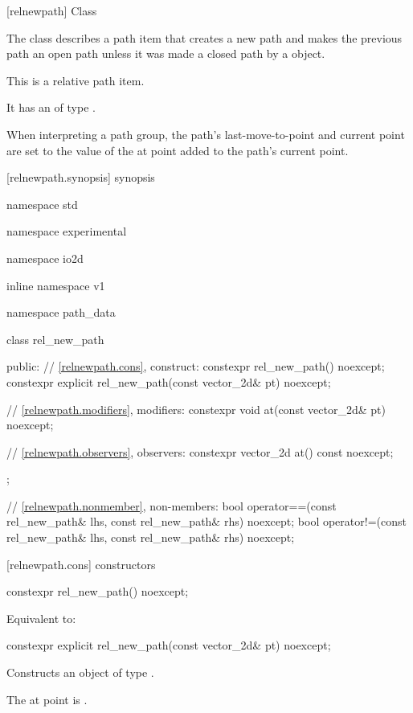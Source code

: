  [relnewpath] {Class }%

\pnum
{}%
The class  describes a path item that creates a new path and makes the previous path an open path unless it was made a closed path by a  object.

\pnum
This is a relative path item.

\pnum
It has an  of type .

\pnum
When interpreting a path group, the path's last-move-to-point and current point are set to the value of the at point added to the path's current point.

 [relnewpath.synopsis] { synopsis}%

\begin{codeblock}
namespace std { namespace experimental { namespace io2d { inline namespace v1 {
  namespace path_data {
    class rel_new_path {
    public:
      // \ref{relnewpath.cons}, construct:
      constexpr rel_new_path() noexcept;
      constexpr explicit rel_new_path(const vector_2d& pt) noexcept;

      // \ref{relnewpath.modifiers}, modifiers:
      constexpr void at(const vector_2d& pt) noexcept;

      // \ref{relnewpath.observers}, observers:
      constexpr vector_2d at() const noexcept;
    };
    
    // \ref{relnewpath.nonmember}, non-members:
    bool operator==(const rel_new_path& lhs, const rel_new_path& rhs) noexcept;
    bool operator!=(const rel_new_path& lhs, const rel_new_path& rhs) noexcept;
  }
} } } }
\end{codeblock}

 [relnewpath.cons] { constructors}%

%
\begin{itemdecl}
constexpr rel_new_path() noexcept;
\end{itemdecl}
\begin{itemdescr}
\pnum
\effects
Equivalent to: 
\end{itemdescr}

%
\begin{itemdecl}
constexpr explicit rel_new_path(const vector_2d& pt) noexcept;
\end{itemdecl}
\begin{itemdescr}
\pnum
\effects
Constructs an object of type .

\pnum
The at point is .
\end{itemdescr}


